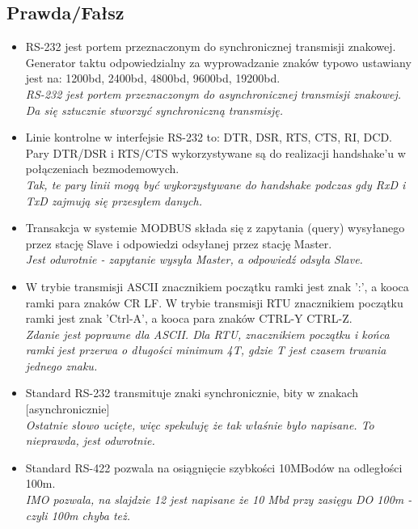 \documentclass[a4paper,twoside]{article}
\begin{document}
\subsection*{Prawda/Fałsz}
\begin{itemize}
	\item \textcolor{nie}{RS-232 jest portem przeznaczonym do synchronicznej transmisji znakowej. Generator taktu odpowiedzialny za wyprowadzanie znaków typowo ustawiany jest na: 1200bd, 2400bd, 4800bd, 9600bd, 19200bd.} \\
	{\small \emph{RS-232 jest portem przeznaczonym do asynchronicznej transmisji znakowej. Da się sztucznie stworzyć synchroniczną transmisję.}}
	
	\item \textcolor{tak}{Linie kontrolne w interfejsie RS-232 to: DTR, DSR, RTS, CTS, RI, DCD. Pary DTR/DSR i RTS/CTS wykorzystywane są do realizacji handshake'u w połączeniach bezmodemowych.} \\ {\small \emph{Tak, te pary linii mogą być wykorzystywane do handshake podczas gdy RxD i TxD zajmują się przesyłem danych.}}
	
	\item \textcolor{nie}{Transakcja w systemie MODBUS składa się z zapytania (query) wysyłanego przez stację Slave i odpowiedzi odsyłanej przez stację Master.} \\
	{\small \emph {Jest odwrotnie - zapytanie wysyła Master, a odpowiedź odsyła Slave.}}
	
	\item \textcolor{nie}{W trybie transmisji ASCII znacznikiem początku ramki jest znak ':', a kooca ramki para znaków CR LF. W trybie transmisji RTU znacznikiem początku ramki jest znak 'Ctrl-A', a kooca para znaków CTRL-Y CTRL-Z.} \\
	{\small \emph{Zdanie jest poprawne dla ASCII. Dla RTU, znacznikiem początku i końca ramki jest przerwa o długości minimum 4T, gdzie T jest czasem trwania jednego znaku.}}
	
	\item \textcolor{nie}{Standard RS-232 transmituje znaki synchronicznie, bity w znakach [asynchronicznie]} \\
	{\small \emph{Ostatnie słowo ucięte, więc spekuluję że tak właśnie było napisane. To nieprawda, jest odwrotnie.}}
	
	\item \textcolor{tak}{Standard RS-422 pozwala na osiągnięcie szybkości 10MBodów na odległości 100m.} \\
	{\small \emph{IMO pozwala, na slajdzie 12 jest napisane że 10 Mbd przy zasięgu DO 100m - czyli 100m chyba też.}}
	

\end{itemize}
\end{document}
